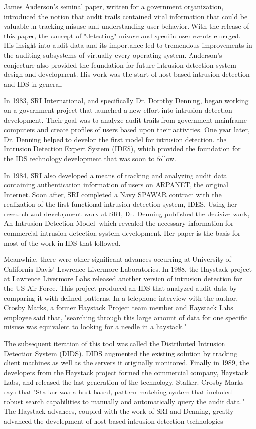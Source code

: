 \documentclass[thesis=M,english]{FITthesis}[2011/07/15]
\begin{document}
James Anderson's seminal paper, written for a government organization, introduced the notion that audit trails contained vital information that could be valuable in tracking misuse and understanding user behavior. With the release of this paper, the concept of "detecting" misuse and specific user events emerged. His insight into audit data and its importance led to tremendous improvements in the auditing subsystems of virtually every operating system. Anderson's conjecture also provided the foundation for future intrusion detection system design and development. His work was the start of host-based intrusion detection and IDS in general.

In 1983, SRI International, and specifically Dr. Dorothy Denning, began working on a government project that launched a new effort into intrusion detection development. Their goal was to analyze audit trails from government mainframe computers and create profiles of users based upon their activities. One year later, Dr. Denning helped to develop the first model for intrusion detection, the Intrusion Detection Expert System (IDES), which provided the foundation for the IDS technology development that was soon to follow.

In 1984, SRI also developed a means of tracking and analyzing audit data containing authentication information of users on ARPANET, the original Internet. Soon after, SRI completed a Navy SPAWAR contract with the realization of the first functional intrusion detection system, IDES. Using her research and development work at SRI, Dr. Denning published the decisive work, An Intrusion Detection Model, which revealed the necessary information for commercial intrusion detection system development. Her paper is the basis for most of the work in IDS that followed.

Meanwhile, there were other significant advances occurring at University of California Davis' Lawrence Livermore Laboratories. In 1988, the Haystack project at Lawrence Livermore Labs released another version of intrusion detection for the US Air Force. This project produced an IDS that analyzed audit data by comparing it with defined patterns. In a telephone interview with the author, Crosby Marks, a former Haystack Project team member and Haystack Labs employee said that, "searching through this large amount of data for one specific misuse was equivalent to looking for a needle in a haystack."

The subsequent iteration of this tool was called the Distributed Intrusion Detection System (DIDS). DIDS augmented the existing solution by tracking client machines as well as the servers it originally monitored. Finally in 1989, the developers from the Haystack project formed the commercial company, Haystack Labs, and released the last generation of the technology, Stalker. Crosby Marks says that "Stalker was a host-based, pattern matching system that included robust search capabilities to manually and automatically query the audit data." The Haystack advances, coupled with the work of SRI and Denning, greatly advanced the development of host-based intrusion detection technologies.
\end{document}
